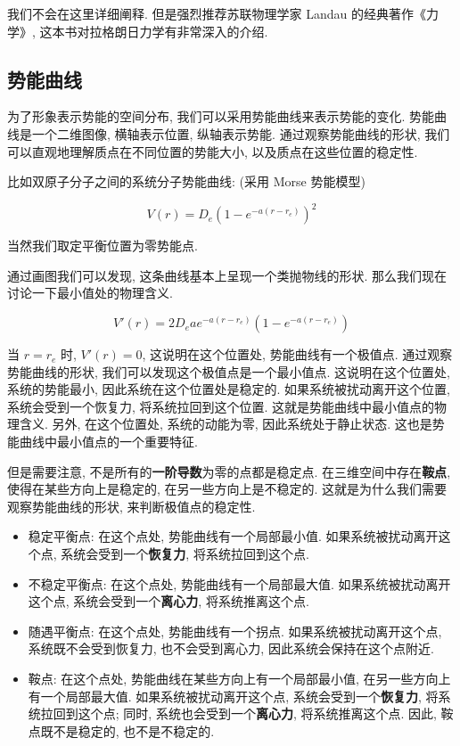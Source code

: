 \documentclass[
  a4paper,
]{ctexrep}
\providecommand{\tightlist}{%
  \setlength{\itemsep}{0pt}\setlength{\parskip}{0pt}}
\begin{document}
我们不会在这里详细阐释. 但是强烈推荐苏联物理学家 Landau
的经典著作《力学》, 这本书对拉格朗日力学有非常深入的介绍.

\subsection{势能曲线}\label{ux52bfux80fdux66f2ux7ebf}

为了形象表示势能的空间分布, 我们可以采用势能曲线来表示势能的变化.
势能曲线是一个二维图像, 横轴表示位置, 纵轴表示势能.
通过观察势能曲线的形状, 我们可以直观地理解质点在不同位置的势能大小,
以及质点在这些位置的稳定性.

比如双原子分子之间的系统分子势能曲线: (采用 Morse 势能模型)

\[
V(r) = D_e \left( 1 - e^{-a(r-r_e)} \right)^2
\]

当然我们取定平衡位置为零势能点.

通过画图我们可以发现, 这条曲线基本上呈现一个类抛物线的形状.
那么我们现在讨论一下最小值处的物理含义.

\[
V'(r) = 2 D_e a e^{-a(r-r_e)} \left( 1 - e^{-a(r-r_e)} \right)
\]

当 \(r = r_e\) 时, \(V'(r) = 0\), 这说明在这个位置处,
势能曲线有一个极值点. 通过观察势能曲线的形状,
我们可以发现这个极值点是一个最小值点. 这说明在这个位置处,
系统的势能最小, 因此系统在这个位置处是稳定的.
如果系统被扰动离开这个位置, 系统会受到一个恢复力, 将系统拉回到这个位置.
这就是势能曲线中最小值点的物理含义. 另外, 在这个位置处, 系统的动能为零,
因此系统处于静止状态. 这也是势能曲线中最小值点的一个重要特征.

但是需要注意, 不是所有的\textbf{一阶导数}为零的点都是稳定点.
在三维空间中存在\textbf{鞍点}, 使得在某些方向上是稳定的,
在另一些方向上是不稳定的. 这就是为什么我们需要观察势能曲线的形状,
来判断极值点的稳定性.

\begin{itemize}
\tightlist
\item
  稳定平衡点: 在这个点处, 势能曲线有一个局部最小值.
  如果系统被扰动离开这个点, 系统会受到一个\textbf{恢复力},
  将系统拉回到这个点.
\item
  不稳定平衡点: 在这个点处, 势能曲线有一个局部最大值.
  如果系统被扰动离开这个点, 系统会受到一个\textbf{离心力},
  将系统推离这个点.
\item
  随遇平衡点: 在这个点处, 势能曲线有一个拐点. 如果系统被扰动离开这个点,
  系统既不会受到恢复力, 也不会受到离心力, 因此系统会保持在这个点附近.
\item
  鞍点: 在这个点处, 势能曲线在某些方向上有一个局部最小值,
  在另一些方向上有一个局部最大值. 如果系统被扰动离开这个点,
  系统会受到一个\textbf{恢复力}, 将系统拉回到这个点; 同时,
  系统也会受到一个\textbf{离心力}, 将系统推离这个点. 因此,
  鞍点既不是稳定的, 也不是不稳定的.
\end{itemize}
\end{document}
